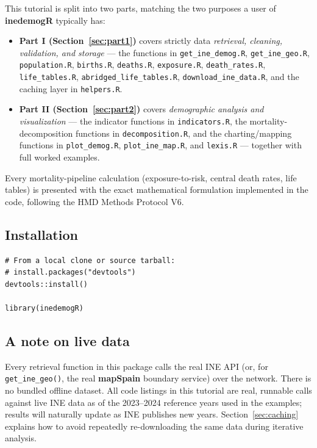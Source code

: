 \documentclass[11pt]{article}
\newcommand{\pkg}[1]{\textbf{#1}}
\newcommand{\fn}[1]{\texttt{#1}}
\begin{document}
This tutorial is split into two parts, matching the two purposes a user of
\pkg{inedemogR} typically has:

\begin{itemize}
  \item \textbf{Part I (Section~\ref{sec:part1})} covers strictly data
    \emph{retrieval, cleaning, validation, and storage} --- the functions in
    \fn{get\_ine\_demog.R}, \fn{get\_ine\_geo.R}, \fn{population.R},
    \fn{births.R}, \fn{deaths.R}, \fn{exposure.R}, \fn{death\_rates.R},
    \fn{life\_tables.R}, \fn{abridged\_life\_tables.R},
    \fn{download\_ine\_data.R}, and the caching layer in \fn{helpers.R}.
  \item \textbf{Part II (Section~\ref{sec:part2})} covers \emph{demographic
    analysis and visualization} --- the indicator functions in
    \fn{indicators.R}, the mortality-decomposition functions in
    \fn{decomposition.R}, and the charting/mapping functions in
    \fn{plot\_demog.R}, \fn{plot\_ine\_map.R}, and \fn{lexis.R} --- together
    with full worked examples.
\end{itemize}

Every mortality-pipeline calculation (exposure-to-risk, central death
rates, life tables) is presented with the exact mathematical formulation
implemented in the code, following the HMD Methods Protocol V6.

\subsection{Installation}

\begin{lstlisting}
# From a local clone or source tarball:
# install.packages("devtools")
devtools::install()

library(inedemogR)
\end{lstlisting}

\subsection{A note on live data}

Every retrieval function in this package calls the real INE API (or, for
\fn{get\_ine\_geo()}, the real \pkg{mapSpain} boundary service) over the
network. There is no bundled offline dataset. All code listings in this
tutorial are real, runnable calls against live INE data as of the 2023--2024
reference years used in the examples; results will naturally update as INE
publishes new years. Section~\ref{sec:caching} explains how to avoid
repeatedly re-downloading the same data during iterative analysis.
\end{document}
